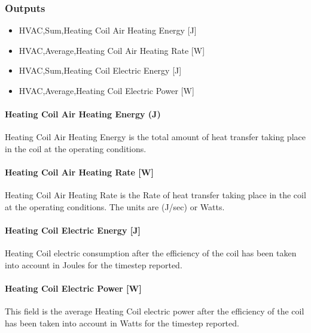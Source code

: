 \subsubsection{Outputs}\label{outputs-2-011}

\begin{itemize}
\item
  HVAC,Sum,Heating Coil Air Heating Energy {[}J{]}
\item
  HVAC,Average,Heating Coil Air Heating Rate {[}W{]}
\item
  HVAC,Sum,Heating Coil Electric Energy {[}J{]}
\item
  HVAC,Average,Heating Coil Electric Power {[}W{]}
\end{itemize}

\paragraph{Heating Coil Air Heating Energy (J)}\label{heating-coil-air-heating-energy-j}

Heating Coil Air Heating Energy is the total amount of heat transfer taking place in the coil at the operating conditions.

\paragraph{Heating Coil Air Heating Rate {[}W{]}}\label{heating-coil-air-heating-rate-w}

Heating Coil Air Heating Rate is the Rate of heat transfer taking place in the coil at the operating conditions. The units are (J/sec) or Watts.

\paragraph{Heating Coil Electric Energy {[}J{]}}\label{heating-coil-electric-energy-j}

Heating Coil electric consumption after the efficiency of the coil has been taken into account in Joules for the timestep reported.

\paragraph{Heating Coil Electric Power {[}W{]}}\label{heating-coil-electric-power-w}

This field is the average Heating Coil electric power after the efficiency of the coil has been taken into account in Watts for the timestep reported.

